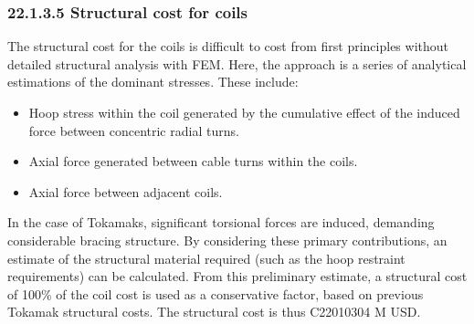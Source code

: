 \subsubsection*{22.1.3.5 Structural cost for coils}

The structural cost for the coils is difficult to cost from first principles without detailed structural analysis with FEM. Here, the approach is a series of analytical estimations of the dominant stresses. These include:

\begin{itemize}
    \item Hoop stress within the coil generated by the cumulative effect of the induced force between concentric radial turns.
    \item Axial force generated between cable turns within the coils. 
    \item Axial force between adjacent coils.
\end{itemize}


In the case of Tokamaks, significant torsional forces are induced, demanding considerable bracing structure. By considering these primary contributions, an estimate of the structural material required (such as the hoop restraint requirements) can be calculated. From this preliminary estimate, a structural cost of 100\% of the coil cost is used as a conservative factor, based on previous Tokamak structural costs. The structural cost is thus C22010304 M USD.


